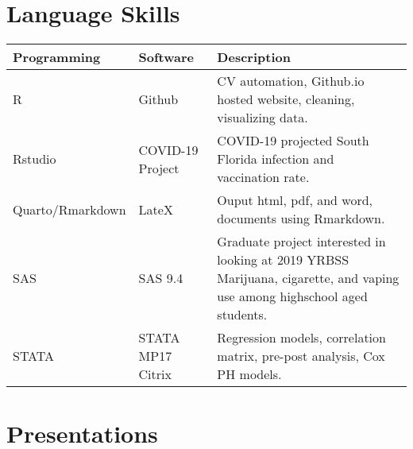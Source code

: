 \documentclass[11pt,a4paper,]{awesome-cv}
\begin{document}
\section{Language Skills}\label{language-skills}

\begin{table}[!h]
\centering
\begin{tabular}{ll>{\raggedright\arraybackslash}p{27em}}
\toprule
Programming & Software & Description\\
\midrule
R & Github & CV automation, Github.io hosted website, cleaning, visualizing data.\\
Rstudio & COVID-19 Project & COVID-19 projected South Florida infection and vaccination rate.\\
Quarto/Rmarkdown & LateX & Ouput html, pdf, and word, documents using Rmarkdown.\\
SAS & SAS 9.4 & Graduate project interested in looking at 2019 YRBSS Marijuana, cigarette, and vaping use among highschool aged students.\\
STATA & STATA MP17 Citrix & Regression models, correlation matrix, pre-post analysis, Cox PH models.\\
\bottomrule
\end{tabular}
\end{table}

\section{Presentations}\label{presentations}
\end{document}
